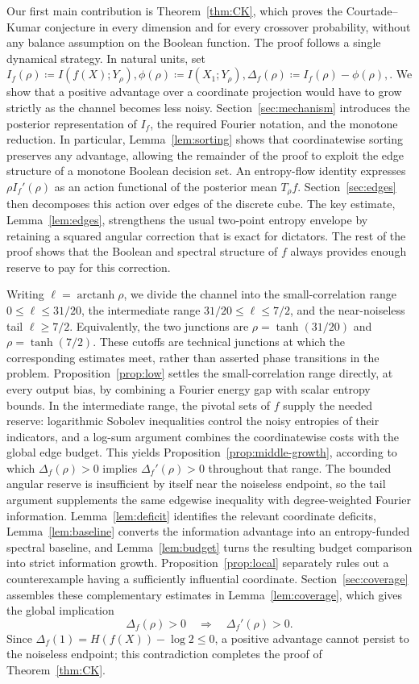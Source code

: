Our first main contribution is Theorem~\ref{thm:CK}, which proves the
Courtade--Kumar conjecture in every dimension and for every crossover
probability, without any balance assumption on the Boolean function. The
proof follows a single dynamical strategy. In natural units, set
$
 I_f(\rho)\coloneqq I(f(X);Y_\rho),
 \phi(\rho)\coloneqq I(X_1;Y_\rho),
 \Delta_f(\rho)\coloneqq I_f(\rho)-\phi(\rho),
$.
We show that a positive advantage over a coordinate projection would have
to grow strictly as the channel becomes less noisy. Section~\ref{sec:mechanism}
introduces the posterior representation of \(I_f\), the required Fourier
notation, and the monotone reduction. In particular,
Lemma~\ref{lem:sorting} shows that coordinatewise sorting preserves any
advantage, allowing the remainder of the proof to exploit the
edge structure of a monotone Boolean decision set. An entropy-flow
identity expresses \(\rho I_f'(\rho)\) as an action functional of the
posterior mean \(T_\rho f\). Section~\ref{sec:edges} then decomposes this
action over edges of the discrete cube. The key estimate,
Lemma~\ref{lem:edges}, strengthens the usual two-point entropy envelope by
retaining a squared angular correction that is exact for dictators. The
rest of the proof shows that the Boolean and spectral structure of \(f\)
always provides enough reserve to pay for this correction.

Writing \(\ell=\operatorname{arctanh}\rho\), we divide the channel into
the small-correlation range \(0\leq\ell\leq31/20\), the intermediate
range \(31/20\leq\ell\leq7/2\), and the near-noiseless tail
\(\ell\geq7/2\). Equivalently, the two junctions are
\(\rho=\tanh(31/20)\) and \(\rho=\tanh(7/2)\). These cutoffs are technical
junctions at which the corresponding estimates meet, rather than
asserted phase transitions in the problem. Proposition~\ref{prop:low}
settles the small-correlation range directly, at every output bias, by
combining a Fourier energy gap with scalar entropy bounds. In the
intermediate range, the pivotal sets of \(f\) supply the needed reserve:
logarithmic Sobolev inequalities control the noisy entropies of their
indicators, and a log-sum argument combines the coordinatewise costs with
the global edge budget. This yields
Proposition~\ref{prop:middle-growth}, according to which
\(\Delta_f(\rho)>0\) implies \(\Delta_f'(\rho)>0\) throughout that range.
The bounded angular reserve is insufficient by itself near the noiseless
endpoint, so the tail argument supplements the same edgewise inequality
with degree-weighted Fourier information. Lemma~\ref{lem:deficit}
identifies the relevant coordinate deficits,
Lemma~\ref{lem:baseline} converts the information advantage into an
entropy-funded spectral baseline, and Lemma~\ref{lem:budget} turns the
resulting budget comparison into strict information growth.
Proposition~\ref{prop:local} separately rules out a counterexample having
a sufficiently influential coordinate. Section~\ref{sec:coverage}
assembles these complementary estimates in
Lemma~\ref{lem:coverage}, which gives the global implication
\[
 \Delta_f(\rho)>0\quad\Longrightarrow\quad\Delta_f'(\rho)>0.
\]
Since \(\Delta_f(1)=H(f(X))-\log 2\leq0\), a positive advantage cannot
persist to the noiseless endpoint; this contradiction completes the proof
of Theorem~\ref{thm:CK}.

